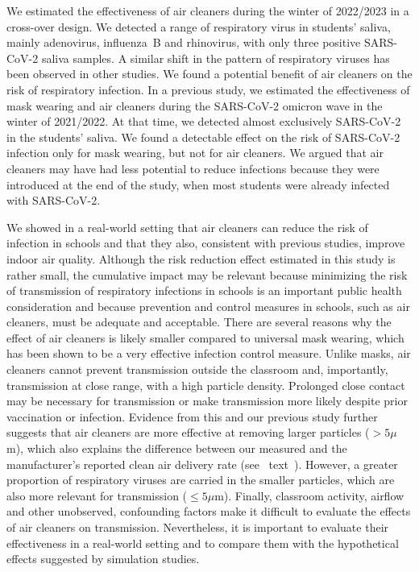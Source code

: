 \documentclass[fleqn,11pt]{wlscirep}
\begin{document}

We estimated the effectiveness of air cleaners during the winter of 2022/2023 in a cross-over design. We detected a range of respiratory virus in students' saliva, mainly adenovirus, influenza~B and rhinovirus, with only three positive SARS-CoV-2 saliva samples. A similar shift in the pattern of respiratory viruses has been observed in other studies\cite{Nygaard2023Lancet,Sauteur2022EuroSurv}. We found a potential benefit of air cleaners on the risk of respiratory infection. In a previous study\cite{Banholzer2023PLoSMed}, we estimated the effectiveness of mask wearing and air cleaners during the SARS-CoV-2 omicron wave in the winter of 2021/2022. At that time, we detected almost exclusively SARS-CoV-2 in the students' saliva. We found a detectable effect on the risk of SARS-CoV-2 infection only for mask wearing, but not for air cleaners. We argued that air cleaners may have had less potential to reduce infections because they were introduced at the end of the study, when most students were already infected with SARS-CoV-2. 


We showed in a real-world setting that air cleaners can reduce the risk of infection in schools and that they also, consistent with previous  studies\cite{Park2020Build,Buising2022InfContr,Banholzer2023PLoSMed}, improve indoor air quality. Although the risk reduction effect estimated in this study is rather small, the cumulative impact may be relevant because minimizing the risk of transmission of respiratory infections in schools is an important public health consideration\cite{Beale2023JOMT} and because prevention and control measures in schools, such as air cleaners, must be adequate and acceptable\cite{WHO2020SchoolMeasures}. There are several reasons why the effect of air cleaners is likely smaller compared to \eg universal mask wearing, which has been shown to be a very effective infection control measure\cite{Banholzer2023PLoSMed,Heinsohn2022,Gettings2021,Leung2020NatMed,Milton2013PLoSPathogens}. Unlike masks, air cleaners cannot prevent transmission outside the classroom and, importantly, transmission at close range, with a high particle density. Prolonged close contact may be necessary for transmission\cite{Leung2020NatMed,Brankston2007LancetID} or make transmission more likely despite prior vaccination or infection\cite{Lind2023NatCommun}. Evidence from this and our previous study\cite{Banholzer2023PLoSMed} further suggests that air cleaners are more effective at removing larger particles ($>5\mu$m), which also explains the difference between our measured and the manufacturer's reported clean air delivery rate (see \supp~text~). However, a greater proportion of respiratory viruses are carried in the smaller particles, which are also more relevant for transmission ($\leq5\mu$m)\cite{Fennelly2020}. Finally, classroom activity, airflow and other unobserved, confounding factors make it difficult to evaluate the effects of air cleaners on transmission. Nevertheless, it is important to evaluate their effectiveness in a real-world setting and to compare them with the hypothetical effects suggested by simulation studies\cite{Lindsley2021,Cortellessa2023Build}.
\end{document}

